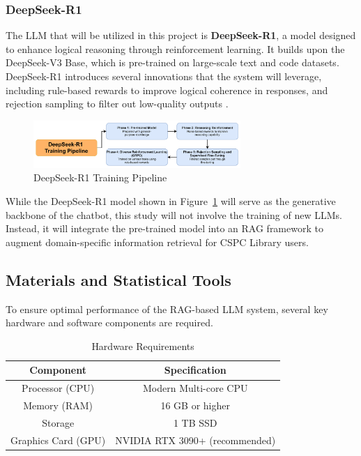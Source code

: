 \begin{refsection}
\subsubsection*{DeepSeek-R1}

The LLM that will be utilized in this project is \textbf{DeepSeek-R1}, a model designed to enhance logical reasoning through reinforcement learning. It builds upon the DeepSeek-V3 Base, which is pre-trained on large-scale text and code datasets. DeepSeek-R1 introduces several innovations that the system will leverage, including rule-based rewards to improve logical coherence in responses, and rejection sampling to filter out low-quality outputs \cite{deepseekai2025deepseekr1}.

\begin{figure}[htbp]
    \centering
    \includegraphics[width=0.7\textwidth]{figures/deepsek.png}
    \caption{DeepSeek-R1 Training Pipeline}
    \label{fig:deepseek_pipeline}
\end{figure}

While the DeepSeek-R1 model shown in Figure~\ref{fig:deepseek_pipeline} will serve as the generative backbone of the chatbot, this study will not involve the training of new LLMs. Instead, it will integrate the pre-trained model into an RAG framework to augment domain-specific information retrieval for CSPC Library users.

\subsection{Materials and Statistical Tools}

To ensure optimal performance of the RAG-based LLM system, several key hardware and software components are required.

\begin{table} [!h]
\centering
\caption{Hardware Requirements}
\label{tab:hardware_requirements}
\begin{tabular}{|c|c|}
\hline
\textbf{Component} & \textbf{Specification} \\
\hline
Processor (CPU) & Modern Multi-core CPU \\
Memory (RAM) & 16 GB or higher \\ 
Storage & 1 TB SSD \\
Graphics Card (GPU) & NVIDIA RTX 3090+ (recommended) \\
\hline
\end{tabular}
\end{table}


\end{refsection}
